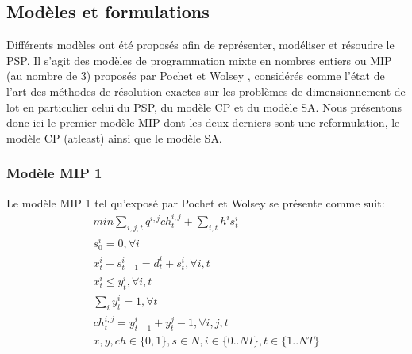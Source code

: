 \documentclass[12pt,a4paper]{article}
\begin{document}
		\subsection{Modèles et formulations}
		Différents modèles ont été proposés afin de représenter, modéliser et résoudre le PSP. Il s'agit des modèles de programmation mixte en nombres entiers ou MIP (au nombre de 3) proposés par Pochet et Wolsey \cite{pochet_wolsey}, considérés comme l'état de l'art des méthodes de résolution exactes sur les problèmes de dimensionnement de lot en particulier celui du PSP, du modèle CP et du modèle SA. Nous présentons donc ici le premier modèle MIP dont les deux derniers sont une reformulation, le modèle CP (atleast) ainsi que le modèle SA.
		\subsubsection{Modèle MIP 1}
		
		Le modèle MIP 1 tel qu'exposé par Pochet et Wolsey se présente comme suit:
		\begin{eqnarray}
			min \sum_{i,j,t} q^{i,j}ch_{t}^{i,j} + \sum_{i,t} h^{i} s_{t}^{i} \\
			s_{0}^{i} = 0, \forall i \\
			x_{t}^{i} + s_{t-1}^{i} = d_{t}^{i} + s_{t}^{i}, \forall i,t \\
			x_{t}^{i} \leq y_{t}^{i}, \forall i,t \\
			\sum_{i} y_{t}^{i} = 1 , \forall t \\
			ch_{t}^{i,j} = y_{t-1}^{i} + y_{t}^{j} - 1, \forall i,j,t \\
			x,y,ch \in \{0,1\}, s \in N, i \in \{0..NI\}, t \in \{1..NT\}
		\end{eqnarray}
		
\end{document}
